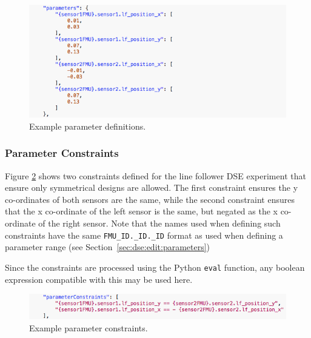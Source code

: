 %
%
%
\begin{figure}[ht]
	\centering
	\includegraphics[scale=0.55]{figures/dse/config-parameters}
	\caption{Example parameter definitions.}\label{fig:dse:edit:parameters}
\end{figure}
%
%
%
\subsubsection{Parameter Constraints}\label{sec:dse:edit:parameterconstraints}

Figure \ref{fig:dse:edit:parameterconstraints} shows two constraints defined for the line follower DSE experiment that ensure only symmetrical designs are allowed.  The first constraint ensures the y co-ordinates of both sensors are the same, while the second constraint ensures that the x co-ordinate of the left sensor is the same, but negated as the x co-ordinate of the right sensor.  Note that the names used when defining such constraints have the same \texttt{FMU\_ID.\@instance\_ID.\@parameter\_ID} format as used when defining a parameter range (see Section~\ref{sec:dse:edit:parameters})

Since the constraints are processed using the Python \texttt{eval} function, any boolean expression compatible with this may be used here.
%
%
%
\begin{figure}[ht]
	\centering
	\includegraphics[scale=0.55]{figures/dse/config-parameterconstraints}
	\caption{Example parameter constraints.}\label{fig:dse:edit:parameterconstraints}
\end{figure}
%
%
%

%
%
%
%
%
%
